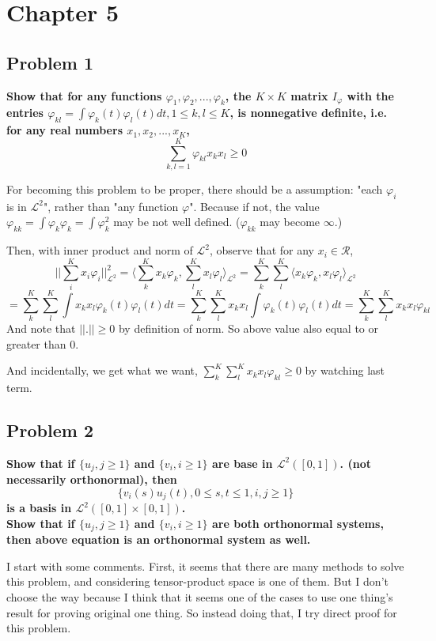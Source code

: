 \documentclass{article}
\begin{document}
\newpage
\section{Chapter 5}
\subsection{Problem 1}
\textbf{
Show that for any functions $\varphi_1,\varphi_2,...,\varphi_k$, the $K\times K$ matrix $I_\varphi$
with the entries $\varphi_{kl}=\int{\varphi_k(t)\varphi_l(t)dt}, 1\leq k,l\leq K$, is nonnegative definite, 
i.e. for any real numbers $x_1,x_2,...,x_K$,
\[\sum_{k,l=1}^K \varphi_{kl}x_kx_l\geq 0\]
}

For becoming this problem to be proper, there should be a assumption: "each $\varphi_i$ is in $\mathcal{L}^2$",
rather than "any function $\varphi$".
Because if not, the value $\varphi_{kk}=\int\varphi_k\varphi_k=\int\varphi_k^2$ may be not well defined. 
($\varphi_{kk}$ may become $\infty$.)

Then, with inner product and norm of $\mathcal{L}^2$, observe that for any $x_i\in\mathcal{R}$,
\[||\sum_i^K{x_i\varphi_i}||_{\mathcal{L}^2}^2 = \langle \sum_k^K{x_k\varphi_k}, \sum_l^K{x_l\varphi_l} \rangle_{\mathcal{L}^2}
= \sum_k^K \sum_l^K \langle x_k\varphi_k, x_l\varphi_l \rangle_{\mathcal{L}^2}\]
\[=\sum_k^K \sum_l^K \int{x_k x_l \varphi_k(t) \varphi_l(t) dt} 
=\sum_k^K \sum_l^K x_k x_l \int{\varphi_k(t) \varphi_l(t) dt} 
=\sum_k^K \sum_l^K x_k x_l \varphi_{kl}\]
And note that $||.||\geq 0 $ by definition of norm. So above value also equal to or greater than 0.

And incidentally, we get what we want, \(\sum_k^K \sum_l^K x_k x_l \varphi_{kl} \geq 0\) by watching last term.


\subsection{Problem 2}
\textbf{
Show that if $\{u_j, j\geq 1\}$ and $\{v_i, i\geq 1\}$ are base in $\mathcal{L}^2([0,1])$.
(not necessarily orthonormal), then
\[\{v_i(s)u_j(t), 0\leq s,t \leq 1 , i,j\geq 1\}\]
is a basis in $\mathcal{L}^2([0,1]\times[0,1])$. \\
Show that if $\{u_j, j\geq 1\}$ and $\{v_i, i\geq 1\}$ are both orthonormal systems,
then above equation is an orthonormal system as well.
}

I start with some comments. First, it seems that there are many methods to solve this problem, and considering tensor-product space is one of them.
But I don't choose the way because I think that it seems one of the cases 
to use one thing's result for proving original one thing.
So instead doing that, I try direct proof for this problem.
\end{document}
